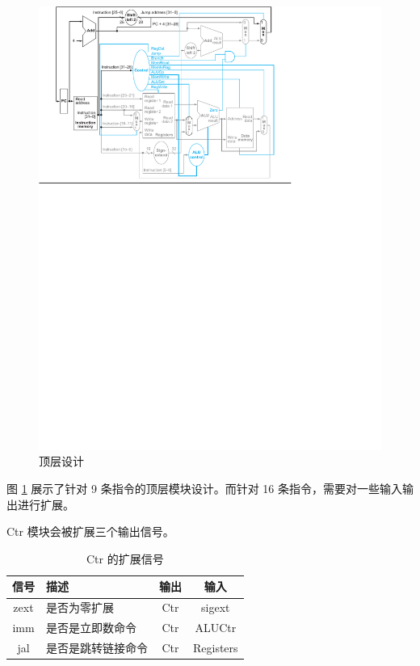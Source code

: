 \documentclass[a4paper,UTF8]{ctexart}
\begin{document}
\begin{figure}[h]
    \centering
    \includegraphics[width=\textwidth]{struct.pdf}
    \caption{顶层设计}
    \label{fig:top}
\end{figure}

图 \ref{fig:top} 展示了针对 9 条指令的顶层模块设计。而针对 16 条指令，需要对一些输入输出进行扩展。

Ctr 模块会被扩展三个输出信号。
\begin{table}[htbp]
    \centering
    \caption{Ctr 的扩展信号}
    \begin{tabular}{>{\sffamily}cl>{\ttfamily}c>{\ttfamily}c}
        \toprule
        信号 & 描述 & 输出 & 输入\\
        \midrule
        zext & 是否为零扩展 & Ctr & sigext \\
        imm & 是否是立即数命令 & Ctr & ALUCtr \\
        jal & 是否是跳转链接命令 & Ctr & Registers \\
        \bottomrule
    \end{tabular}
\end{table}
\end{document}

